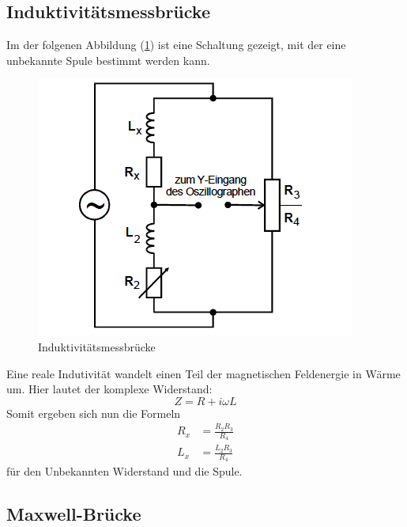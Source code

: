 \subsection{Induktivitätsmessbrücke}
Im der folgenen Abbildung (\ref{fig:indu}) ist eine Schaltung gezeigt,
mit der eine unbekannte Spule bestimmt werden kann.
\begin{figure}
  \centering
  \includegraphics[scale = 0.7]{Indu.PNG}
  \caption{Induktivitätsmessbrücke\protect\cite{on3}}
  \label{fig:indu}
\end{figure}
Eine reale Indutivität wandelt einen Teil der magnetischen Feldenergie in Wärme um.
Hier lautet der komplexe Widerstand:
\begin{equation*}
  Z = R + i\omega L
\end{equation*}
Somit ergeben sich nun die Formeln
\begin{align}
  R_x &= \frac{R_2R_3}{R_4} \\
  L_x &= \frac{L_2R_3}{R_4}
\end{align}
für den Unbekannten Widerstand und die Spule.

\subsection{Maxwell-Brücke}

